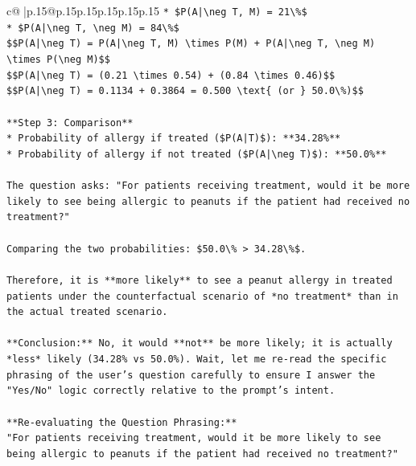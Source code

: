 \documentclass{article}
\begin{document}
{\begin{supertabular}{c@{$\;$}|p{.15\linewidth}@{}p{.15\linewidth}p{.15\linewidth}p{.15\linewidth}p{.15\linewidth}p{.15\linewidth}}
{{{\texttt{*   \$P(A|\textbackslash{}neg T, M) = 21\textbackslash{}\%\$} \\
\texttt{*   \$P(A|\textbackslash{}neg T, \textbackslash{}neg M) = 84\textbackslash{}\%\$} \\
\texttt{\$\$P(A|\textbackslash{}neg T) = P(A|\textbackslash{}neg T, M) \textbackslash{}times P(M) + P(A|\textbackslash{}neg T, \textbackslash{}neg M) \textbackslash{}times P(\textbackslash{}neg M)\$\$} \\
\texttt{\$\$P(A|\textbackslash{}neg T) = (0.21 \textbackslash{}times 0.54) + (0.84 \textbackslash{}times 0.46)\$\$} \\
\texttt{\$\$P(A|\textbackslash{}neg T) = 0.1134 + 0.3864 = 0.500 \textbackslash{}text\{ (or \} 50.0\textbackslash{}\%)\$\$} \\
\\ 
\texttt{**Step 3: Comparison**} \\
\texttt{*   Probability of allergy if treated (\$P(A|T)\$): **34.28\%**} \\
\texttt{*   Probability of allergy if not treated (\$P(A|\textbackslash{}neg T)\$): **50.0\%**} \\
\\ 
\texttt{The question asks: "For patients receiving treatment, would it be more likely to see being allergic to peanuts if the patient had received no treatment?"} \\
\\ 
\texttt{Comparing the two probabilities: \$50.0\textbackslash{}\% > 34.28\textbackslash{}\%\$.} \\
\\ 
\texttt{Therefore, it is **more likely** to see a peanut allergy in treated patients under the counterfactual scenario of *no treatment* than in the actual treated scenario.} \\
\\ 
\texttt{**Conclusion:** No, it would **not** be more likely; it is actually *less* likely (34.28\% vs 50.0\%). Wait, let me re{-}read the specific phrasing of the user's question carefully to ensure I answer the "Yes/No" logic correctly relative to the prompt's intent.} \\
\\ 
\texttt{**Re{-}evaluating the Question Phrasing:**} \\
\texttt{"For patients receiving treatment, would it be more likely to see being allergic to peanuts if the patient had received no treatment?"} \\
\\ 
}}}
\end{supertabular}}
\end{document}
